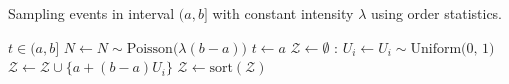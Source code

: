 \begin{algorithm}[h!]
\caption{Sampling events in interval $(a, b]$ with constant intensity $\lambda$ using order statistics. }\label{alg:PPP_order_stats}
\begin{algorithmic}[1]
\Require $t \in (a, b]$
\State $N \gets N \sim \textrm{Poisson}\big(\lambda (b-a)\big)$
\State $t \gets a$
\State $\mathcal{Z} \gets \emptyset$ 
    :
        \State $U_i \gets U_i \sim \textrm{Uniform(0, 1)}$ 
        \State $\mathcal{Z} \gets \mathcal{Z} \cup \{a + (b-a) U_i\} $ 
    \EndFor
    \State $\mathcal{Z} \gets \textrm{sort}(\mathcal{Z})$ 
\EndIf
\State
{} 
\end{algorithmic}
\end{algorithm}
